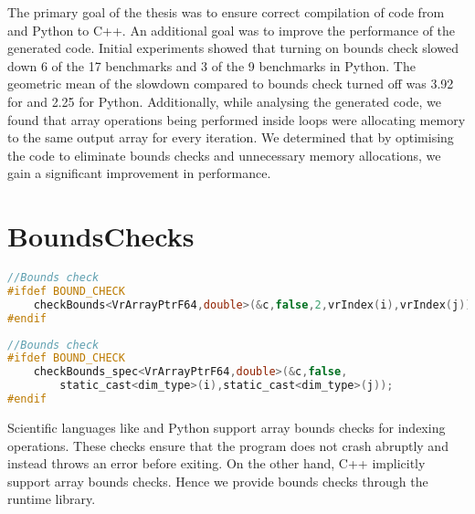 The primary goal of the thesis was to ensure correct compilation of code from \matlab and Python to C++. An additional goal was to improve the performance of the generated code. Initial experiments showed that turning on bounds check slowed down 6 of the 17 benchmarks and 3 of the 9 benchmarks in Python. The geometric mean of the slowdown compared to bounds check turned off was 3.92 for \matlab and 2.25 for Python. Additionally, while analysing the generated code, we found that array operations being performed inside loops were allocating memory to the same output array for every iteration. We determined that by optimising the code to eliminate bounds checks and unnecessary memory allocations, we gain a significant improvement in performance. 
\section{BoundsChecks}
\begin{lstlisting}[float,language=c,caption={An example of the bounds check function call.},label={lst:boundscheck}]
//Bounds check 
#ifdef BOUND_CHECK
	checkBounds<VrArrayPtrF64,double>(&c,false,2,vrIndex(i),vrIndex(j));
#endif
\end{lstlisting}
\begin{lstlisting}[float,language=c,caption={An example of the specialised bounds check function call},label={lst:boundscheck_spec}]
//Bounds check 
#ifdef BOUND_CHECK
	checkBounds_spec<VrArrayPtrF64,double>(&c,false,
		static_cast<dim_type>(i),static_cast<dim_type>(j));
#endif
\end{lstlisting}
Scientific languages like \matlab and Python support array bounds checks for indexing operations. These checks ensure that the program does not crash abruptly and instead throws an error before exiting. On the other hand, C++ implicitly support array bounds checks. Hence we provide bounds checks through the runtime library. \\
